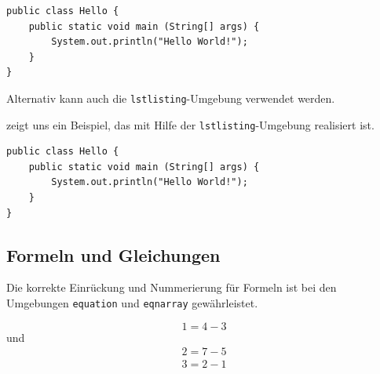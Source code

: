 \documentclass[utf8,biblatex]{lni}
\begin{document}
\begin{verbatim}
public class Hello {
    public static void main (String[] args) {
        System.out.println("Hello World!");
    }
}
\end{verbatim}

Alternativ kann auch die \texttt{lstlisting}-Umgebung verwendet werden.

 zeigt uns ein Beispiel, das mit Hilfe der \texttt{lstlisting}-Umgebung realisiert ist.

\begin{lstlisting}[caption={Beschreibung}, label=L1]
public class Hello {
    public static void main (String[] args) {
        System.out.println("Hello World!");
    }
}
\end{lstlisting}

\subsection{Formeln und Gleichungen}

Die korrekte Einrückung und Nummerierung für Formeln ist bei den Umgebungen \texttt{equation} und \texttt{eqnarray} gewährleistet.

\begin{equation}
  1=4-3
\end{equation}
und
\begin{eqnarray}
  2=7-5\\
  3=2-1
\end{eqnarray}

\printbibliography
\end{document}
